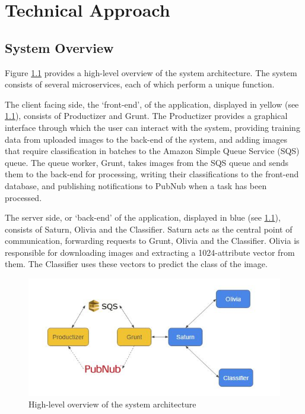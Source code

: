 \chapter{Technical Approach}\label{chapter:tech}
\section{System Overview}
Figure \ref{fig:sys_overview} provides a high-level overview of the system architecture. The system consists of several microservices, each of which perform a unique function. 

The client facing side, the ‘front-end’, of the application, displayed in yellow (see \ref{fig:sys_overview}), consists of Productizer and Grunt. The Productizer provides a graphical interface through which the user can interact with the system, providing training data from uploaded images to the back-end of the system, and adding images that require classification in batches to the Amazon Simple Queue Service (SQS) queue. The queue worker, Grunt, takes images from the SQS queue and sends them to the back-end for processing, writing their classifications to the front-end database, and publishing notifications to PubNub when a task has been processed.

The server side, or ‘back-end’ of the application, displayed in blue (see \ref{fig:sys_overview}), consists of Saturn, Olivia and the Classifier. Saturn acts as the central point of communication, forwarding requests to Grunt, Olivia and the Classifier. Olivia is responsible for downloading images and extracting a 1024-attribute vector from them. The Classifier uses these vectors to predict the class of the image.

\begin{figure}[H]
    \centering
    \includegraphics[width=\textwidth]{figs/4/sys_overview}
    \caption{High-level overview of the system architecture}
    \label{fig:sys_overview}
\end{figure}

